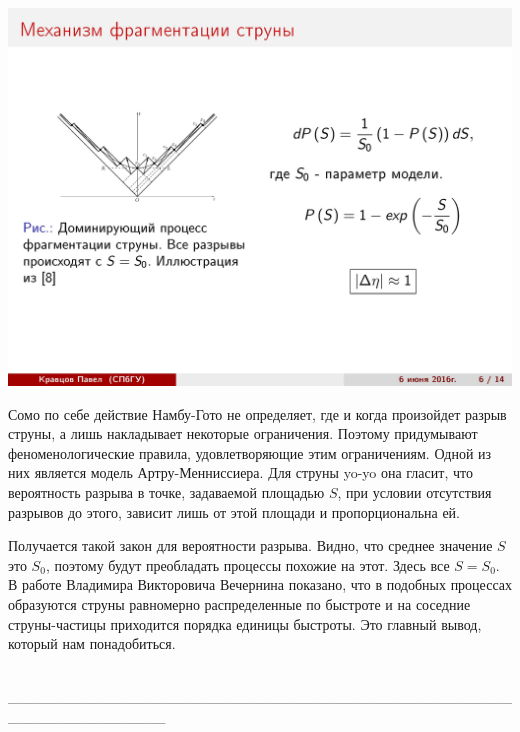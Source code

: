 \documentclass[14pt]{article}
\renewcommand{\line}{\\ \_\_\_\_\_\_\_\_\_\_\_\_\_\_\_\_\_\_\_\_\_\_\_\_\_\_\_\_\_\_\_\_\_\_\_\_\_\_\_\_\_\_\_\_\_\_\_\_\_\_\_\_\_\_\_\_\_\_\_\_\_\_\_ \\ }
\begin{document}
\begin{minipage}[h]{0.35\linewidth}
\includegraphics[width=1\linewidth]{page-06.jpg}
\end{minipage}
\begin{minipage}[h]{0.60\linewidth}
Сомо по себе действие Намбу-Гото не определяет, где и когда произойдет разрыв струны, а лишь накладывает некоторые ограничения. Поэтому придумывают феноменологические правила, удовлетворяющие этим ограничениям. Одной из них является модель Артру-Менниссиера. Для струны yo-yo она гласит, что вероятность разрыва в точке, задаваемой площадью $S$, при условии отсутствия разрывов до этого, зависит лишь от этой площади и пропорциональна ей.

Получается такой закон для вероятности разрыва. Видно, что среднее значение $S$ это $S_0$, поэтому будут преобладать процессы похожие на этот. Здесь все $S = S_0$. В работе Владимира Викторовича Вечернина показано, что в подобных процессах образуются струны равномерно распределенные по быстроте и на соседние струны-частицы приходится порядка единицы быстроты. Это главный вывод, который нам понадобиться.
\end{minipage}
\line

\newpage
$$$$
$$$$
$$$$
$$$$
\end{document}
